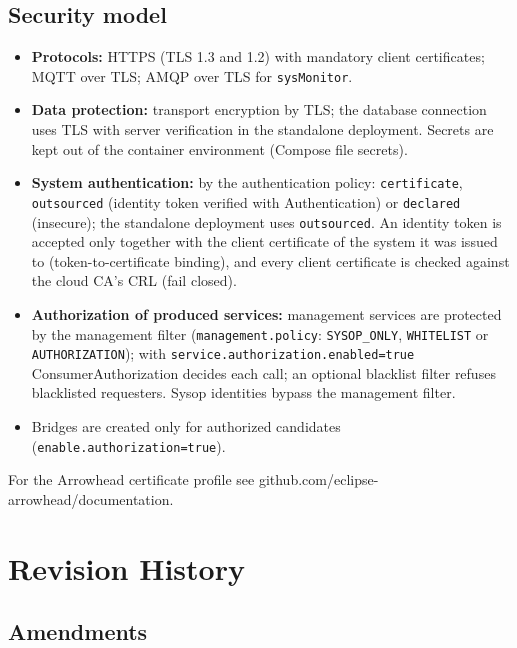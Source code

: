 \documentclass[a4paper]{arrowhead}
\begin{document}
\subsection{Security model}


\begin{itemize}
  \item \textbf{Protocols:} HTTPS (TLS 1.3 and 1.2) with mandatory client certificates; MQTT over TLS; AMQP over TLS for \texttt{sysMonitor}.
  \item \textbf{Data protection:} transport encryption by TLS; the database connection uses TLS with server verification in the standalone deployment. Secrets are kept out of the container environment (Compose file secrets).
  \item \textbf{System authentication:} by the authentication policy: \texttt{certificate}, \texttt{outsourced} (identity token verified with Authentication) or \texttt{declared} (insecure); the standalone deployment uses \texttt{outsourced}. An identity token is accepted only together with the client certificate of the system it was issued to (token-to-certificate binding), and every client certificate is checked against the cloud CA's CRL (fail closed).
  \item \textbf{Authorization of produced services:} management services are protected by the management filter (\texttt{management.policy}: \texttt{SYSOP\_ONLY}, \texttt{WHITELIST} or \texttt{AUTHORIZATION}); with \texttt{service.authorization.enabled=true} ConsumerAuthorization decides each call; an optional blacklist filter refuses blacklisted requesters. Sysop identities bypass the management filter.
  \item Bridges are created only for authorized candidates (\texttt{enable.\allowbreak{}authorization=\allowbreak{}true}).
\end{itemize}

For the Arrowhead certificate profile see github.com/eclipse-arrowhead/documentation.





\newpage

\section{Revision History}
\subsection{Amendments}
\end{document}
